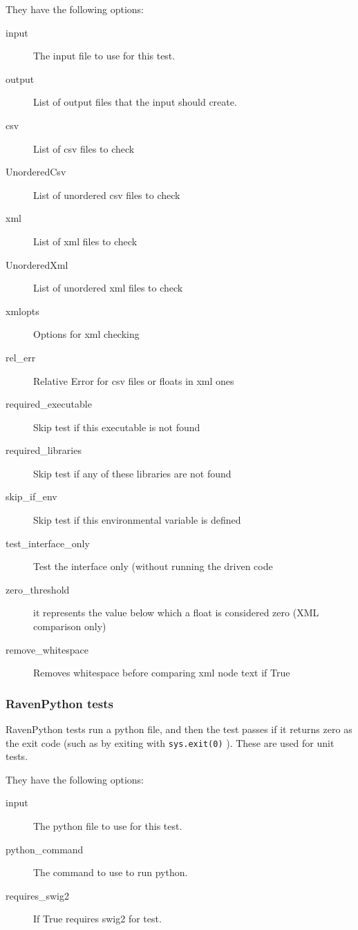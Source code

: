 \documentclass{article}
\begin{document}
They have the following options:

\begin{description}
    \item[input] The input file to use for this test.
    \item[output] List of output files that the input should create.
    \item[csv] List of csv files to check
    \item[UnorderedCsv] List of unordered csv files to check
    \item[xml] List of xml files to check
    \item[UnorderedXml] List of unordered xml files to check
    \item[xmlopts] Options for xml checking
    \item[rel\_err] Relative Error for csv files or floats in xml ones
    \item[required\_executable] Skip test if this executable is not found
    \item[required\_libraries] Skip test if any of these libraries are not found
    \item[skip\_if\_env] Skip test if this environmental variable is defined
    \item[test\_interface\_only] Test the interface only (without running the driven code
    \item[zero\_threshold] it represents the value below which a float is considered zero (XML comparison only)
    \item[remove\_whitespace] Removes whitespace before comparing xml node text if True
\end{description}

\subsubsection{RavenPython tests}

RavenPython tests run a python file, and then the test passes if it
returns zero as the exit code (such as by exiting with
\verb'sys.exit(0)' ).  These are used for unit tests.

They have the following options:

\begin{description}
\item[input] The python file to use for this test.
\item[python\_command] The command to use to run python.
\item[requires\_swig2] If True requires swig2 for test.
\end{description}
\end{document}

